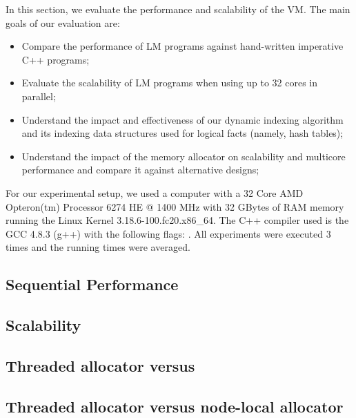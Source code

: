 In this section, we evaluate the performance and scalability of the VM. The main
goals of our evaluation are:

\begin{itemize}
   \item Compare the performance of LM programs against hand-written
      imperative C++ programs;
   \item Evaluate the scalability of LM programs when using up to 32 cores
      in parallel;
   \item Understand the impact and effectiveness of our dynamic indexing
      algorithm and its indexing data structures used for logical facts (namely,
      hash tables);
   \item Understand the impact of the memory allocator on scalability and
      multicore performance and compare it against alternative designs;
\end{itemize}

For our experimental setup, we used a computer with a 32 Core AMD
Opteron(tm) Processor 6274 HE $@$ 1400 MHz with 32 GBytes of RAM memory running
the Linux Kernel 3.18.6-100.fc20.x86\_64. The C++ compiler used is the GCC
4.8.3 (g++) with the following  flags: .  All experiments were executed 3 times and the running times
were averaged.

\subsection{Sequential Performance}\label{section:implementation:performance}


\subsection{Scalability}


\clearpage

\subsection{Threaded allocator versus }



\subsection{Threaded allocator versus node-local allocator}\label{section:implementation:alternative_allocator}

